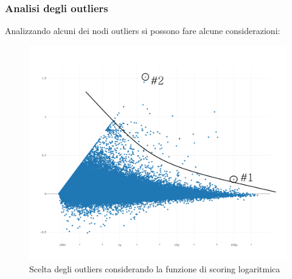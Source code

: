\documentclass[a4paper, 12pt]{article}
\begin{document}
\subsubsection{Analisi degli outliers}
Analizzando alcuni dei nodi outliers si possono fare alcune considerazioni:
\begin{figure}[H]
  \includegraphics[width=0.7\linewidth]{images/grafico-5.png}
  \caption{Scelta degli outliers considerando la funzione di scoring logaritmica}
\end{figure}
\medskip
\end{document}
